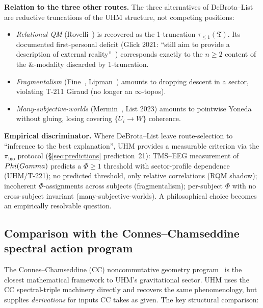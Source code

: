 \textbf{Relation to the three other routes.} The three alternatives
of DeBrota--List are reductive truncations of the UHM structure, not
competing positions:
\begin{itemize}[leftmargin=2em,nosep]
  \item \emph{Relational QM} (Rovelli~\cite{rovelli1996rqm}) is
        recovered as the 1-truncation $\tau_{\leq 1}(\mathfrak T)$.
        Its documented first-personal deficit (Glick 2021: ``still
        aim to provide a description of external
        reality''~\cite{glick2021qbism}) corresponds exactly to the
        $n \geq 2$ content of the $\&$-modality discarded by
        1-truncation.
  \item \emph{Fragmentalism}
        (Fine~\cite{fine2005tense}, Lipman~\cite{lipman2023subjective})
        amounts to dropping descent in a sector, violating T-211
        Giraud (no longer an $\infty$-topos).
  \item \emph{Many-subjective-worlds}
        (Mermin~\cite{mermin2019better}, List 2023) amounts to
        pointwise Yoneda without gluing, losing covering
        $\{U_i \to W\}$ coherence.
\end{itemize}

\textbf{Empirical discriminator.} Where DeBrota--List leave
route-selection to ``inference to the best explanation'', UHM
provides a measurable criterion via the $\pi_{\mathrm{bio}}$ protocol
(\S\ref{sec:predictions} prediction~21): TMS--EEG measurement of
$Phi(Gamma)$ predicts a $\Phi \geq 1$ threshold with sector-profile
dependence (UHM/T-221); no predicted threshold, only relative
correlations (RQM shadow); incoherent $\Phi$-assignments across
subjects (fragmentalism); per-subject $\Phi$ with no cross-subject
invariant (many-subjective-worlds). A philosophical choice becomes
an empirically resolvable question.

\subsection{Comparison with the Connes--Chamseddine spectral action program}
\label{subsec:connes-comparison}

The Connes--Chamseddine (CC) noncommutative geometry program~\cite{connes1996,chamseddine2007}
is the closest mathematical framework to UHM's gravitational sector. UHM uses the CC
spectral-triple machinery directly and recovers the same phenomenology, but supplies
\emph{derivations} for inputs CC takes as given. The key structural comparison:

